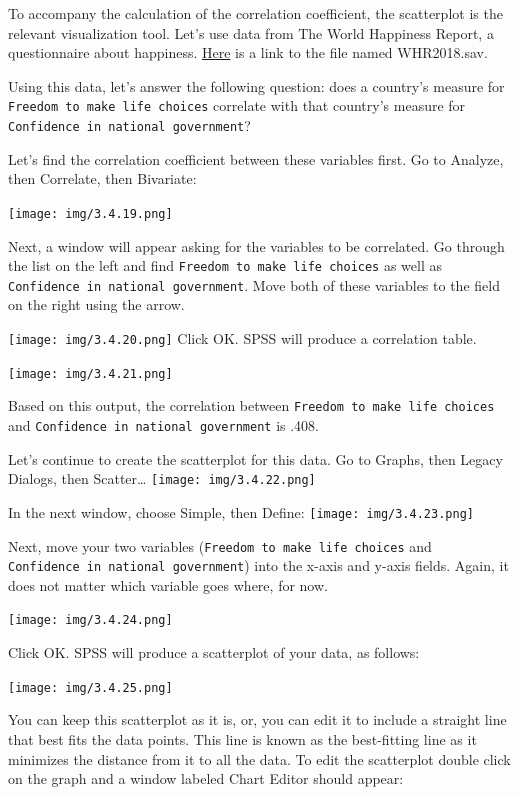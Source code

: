 \documentclass[]{book}
\begin{document}
To accompany the calculation of the correlation coefficient, the
scatterplot is the relevant visualization tool. Let's use data from The
World Happiness Report, a questionnaire about happiness.
\href{https://github.com/CrumpLab/statisticsLab/blob/master/data/spssdata/WHR2018.sav}{Here}
is a link to the file named WHR2018.sav.

Using this data, let's answer the following question: does a country's
measure for \texttt{Freedom\ to\ make\ life\ choices} correlate with
that country's measure for
\texttt{Confidence\ in\ national\ government}?

Let's find the correlation coefficient between these variables first. Go
to {Analyze}, then {Correlate}, then {Bivariate}:

\texttt{[image: img/3.4.19.png]}

Next, a window will appear asking for the variables to be correlated. Go
through the list on the left and find
\texttt{Freedom\ to\ make\ life\ choices} as well as
\texttt{Confidence\ in\ national\ government}. Move both of these
variables to the field on the right using the arrow.

\texttt{[image: img/3.4.20.png]} Click OK. SPSS will produce a
correlation table.

\texttt{[image: img/3.4.21.png]}

Based on this output, the correlation between
\texttt{Freedom\ to\ make\ life\ choices} and
\texttt{Confidence\ in\ national\ government} is .408.

Let's continue to create the scatterplot for this data. Go to {Graphs},
then {Legacy Dialogs}, then {Scatter\ldots{}}
\texttt{[image: img/3.4.22.png]}

In the next window, choose {Simple}, then {Define}:
\texttt{[image: img/3.4.23.png]}

Next, move your two variables (\texttt{Freedom\ to\ make\ life\ choices}
and \texttt{Confidence\ in\ national\ government}) into the x-axis and
y-axis fields. Again, it does not matter which variable goes where, for
now.

\texttt{[image: img/3.4.24.png]}

Click {OK}. SPSS will produce a scatterplot of your data, as follows:

\texttt{[image: img/3.4.25.png]}

You can keep this scatterplot as it is, or, you can edit it to include a
straight line that best fits the data points. This line is known as the
best-fitting line as it minimizes the distance from it to all the data.
To edit the scatterplot double click on the graph and a window labeled
Chart Editor should appear:
\end{document}
